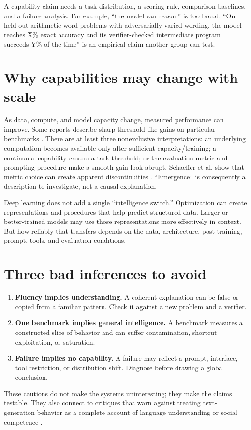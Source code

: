 \documentclass[11pt]{article}
\begin{document}
A capability claim needs a task distribution, a scoring rule, comparison baselines, and a failure analysis. For example, ``the model can reason'' is too broad. ``On held-out arithmetic word problems with adversarially varied wording, the model reaches X\% exact accuracy and its verifier-checked intermediate program succeeds Y\% of the time'' is an empirical claim another group can test.

\section{Why capabilities may change with scale}
As data, compute, and model capacity change, measured performance can improve. Some reports describe sharp threshold-like gains on particular benchmarks \cite{wei2022emergent}. There are at least three nonexclusive interpretations: an underlying computation becomes available only after sufficient capacity/training; a continuous capability crosses a task threshold; or the evaluation metric and prompting procedure make a smooth gain look abrupt. Schaeffer et al. show that metric choice can create apparent discontinuities \cite{schaeffer2023mirage}. ``Emergence'' is consequently a description to investigate, not a causal explanation.

Deep learning does not add a single ``intelligence switch.'' Optimization can create representations and procedures that help predict structured data. Larger or better-trained models may use those representations more effectively in context. But how reliably that transfers depends on the data, architecture, post-training, prompt, tools, and evaluation conditions.

\section{Three bad inferences to avoid}
\begin{enumerate}[leftmargin=*]
\item \textbf{Fluency implies understanding.} A coherent explanation can be false or copied from a familiar pattern. Check it against a new problem and a verifier.
\item \textbf{One benchmark implies general intelligence.} A benchmark measures a constructed slice of behavior and can suffer contamination, shortcut exploitation, or saturation.
\item \textbf{Failure implies no capability.} A failure may reflect a prompt, interface, tool restriction, or distribution shift. Diagnose before drawing a global conclusion.
\end{enumerate}
These cautions do not make the systems uninteresting; they make the claims testable. They also connect to critiques that warn against treating text-generation behavior as a complete account of language understanding or social competence \cite{bender2021stochastic}.
\end{document}

